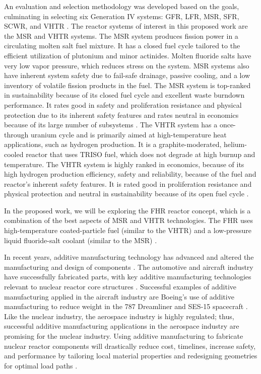 An evaluation and selection methodology was developed based on the goals, 
culminating in selecting six Generation IV systems: \gls{GFR}, 
\gls{LFR}, \gls{MSR}, \gls{SFR}, \gls{SCWR}, and \gls{VHTR} \cite{gif_technology_2002}. 
The reactor systems of interest in this proposed work are the \gls{MSR} and 
\gls{VHTR} systems. 
The MSR system produces fission power in a circulating molten salt fuel mixture. 
It has a closed fuel cycle tailored to the efficient utilization of plutonium 
and minor actinides. 
Molten fluoride salts have very low vapor pressure, which reduces stress on the 
system. 
MSR systems also have inherent system safety due to fail-safe drainage, 
passive cooling, and a low inventory of volatile fission products in the fuel. 
The MSR system is top-ranked in sustainability because of its closed fuel cycle 
and excellent waste burndown performance. 
It rates good in safety and proliferation resistance and physical protection 
due to its inherent safety features and rates neutral in economics because of
its large number of subsystems \cite{gif_technology_2002}.  
The \gls{VHTR} system has a once-through uranium cycle and is primarily aimed at 
high-temperature heat applications, such as hydrogen production. 
It is a graphite-moderated, helium-cooled reactor that uses \gls{TRISO} fuel, 
which does not degrade at high burnup and temperature.  
The \gls{VHTR} system is highly ranked in economics, because of its high hydrogen 
production efficiency, safety and reliability, because of the fuel and reactor's 
inherent safety features. 
It is rated good in proliferation resistance and physical protection and 
neutral in sustainability because of its open fuel cycle \cite{gif_technology_2002}. 

In the proposed work, we will be exploring the \gls{FHR} reactor concept, which 
is a combination of the best aspects of \gls{MSR} and \gls{VHTR} technologies. 
The \gls{FHR} uses high-temperature coated-particle fuel (similar to the \gls{VHTR}) 
and a low-pressure liquid fluoride-salt coolant (similar to the \gls{MSR})
\cite{forsberg_fluoride-salt-cooled_2012,facilitators_fluoride-salt-cooled_2013}.

In recent years, additive manufacturing technology has advanced and altered the
manufacturing and design of components \cite{simpson_considerations_2019}. 
The automotive and aircraft industry have successfully fabricated parts, with 
key additive manufacturing technologies relevant to nuclear reactor core 
structures \cite{murr_frontiers_2016}.  
Successful examples of additive manufacturing applied in the aircraft industry 
are Boeing’s use of additive manufacturing to reduce weight in the 787 Dreamliner
\cite{noauthor_printed_2017} and SES-15 spacecraft \cite{noauthor_boeing_nodate}. 
Like the nuclear industry, the aerospace industry is highly regulated; thus, 
successful additive manufacturing applications in the aerospace industry are 
promising for the nuclear industry. 
Using additive manufacturing to fabricate nuclear reactor components will 
drastically reduce cost, timelines, increase safety, and performance by 
tailoring local material properties and redesigning geometries for optimal load paths 
\cite{simpson_considerations_2019}. 

